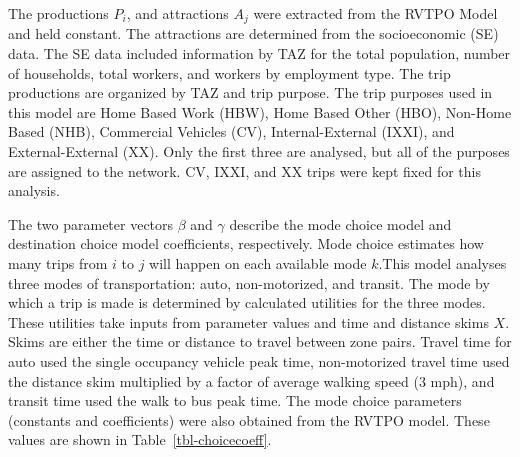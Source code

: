 \documentclass[
  futuretransp,
  submit,
  moreauthors,
]{Definitions/mdpi}
\begin{document}
The productions \(P_i\), and attractions \(A_j\) were extracted from the
RVTPO Model and held constant. The attractions are determined from the
socioeconomic (SE) data. The SE data included information by TAZ for the
total population, number of households, total workers, and workers by
employment type. The trip productions are organized by TAZ and trip
purpose. The trip purposes used in this model are Home Based Work (HBW),
Home Based Other (HBO), Non-Home Based (NHB), Commercial Vehicles (CV),
Internal-External (IXXI), and External-External (XX). Only the first
three are analysed, but all of the purposes are assigned to the network.
CV, IXXI, and XX trips were kept fixed for this analysis.

The two parameter vectors \(\beta\) and \(\gamma\) describe the mode
choice model and destination choice model coefficients, respectively.
Mode choice estimates how many trips from \(i\) to \(j\) will happen on
each available mode \(k\).This model analyses three modes of
transportation: auto, non-motorized, and transit. The mode by which a
trip is made is determined by calculated utilities for the three modes.
These utilities take inputs from parameter values and time and distance
skims \(X\). Skims are either the time or distance to travel between
zone pairs. Travel time for auto used the single occupancy vehicle peak
time, non-motorized travel time used the distance skim multiplied by a
factor of average walking speed (3 mph), and transit time used the walk
to bus peak time. The mode choice parameters (constants and
coefficients) were also obtained from the RVTPO model. These values are
shown in Table~\ref{tbl-choicecoeff}.
\end{document}
